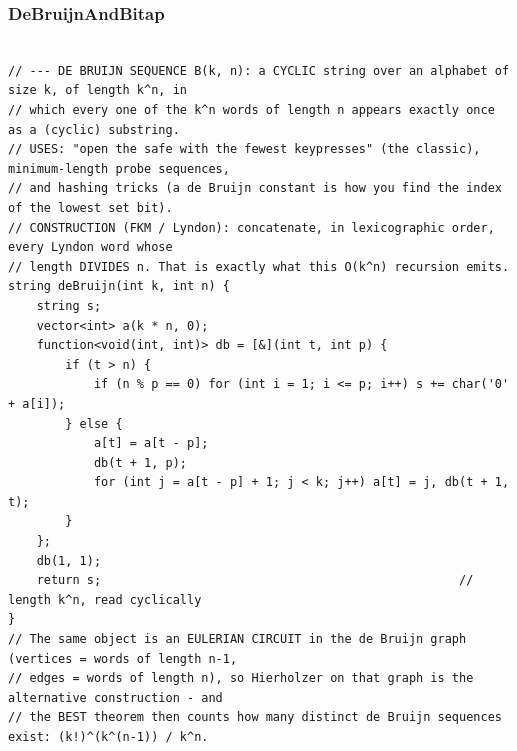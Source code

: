 \documentclass[9pt,a4paper,twocolumn]{extarticle}
\begin{document}
\subsubsection{DeBruijnAndBitap}
\nopagebreak
\begin{lstlisting}

// --- DE BRUIJN SEQUENCE B(k, n): a CYCLIC string over an alphabet of size k, of length k^n, in
// which every one of the k^n words of length n appears exactly once as a (cyclic) substring.
// USES: "open the safe with the fewest keypresses" (the classic), minimum-length probe sequences,
// and hashing tricks (a de Bruijn constant is how you find the index of the lowest set bit).
// CONSTRUCTION (FKM / Lyndon): concatenate, in lexicographic order, every Lyndon word whose
// length DIVIDES n. That is exactly what this O(k^n) recursion emits.
string deBruijn(int k, int n) {
    string s;
    vector<int> a(k * n, 0);
    function<void(int, int)> db = [&](int t, int p) {
        if (t > n) {
            if (n % p == 0) for (int i = 1; i <= p; i++) s += char('0' + a[i]);
        } else {
            a[t] = a[t - p];
            db(t + 1, p);
            for (int j = a[t - p] + 1; j < k; j++) a[t] = j, db(t + 1, t);
        }
    };
    db(1, 1);
    return s;                                                  // length k^n, read cyclically
}
// The same object is an EULERIAN CIRCUIT in the de Bruijn graph (vertices = words of length n-1,
// edges = words of length n), so Hierholzer on that graph is the alternative construction - and
// the BEST theorem then counts how many distinct de Bruijn sequences exist: (k!)^(k^(n-1)) / k^n.


\end{lstlisting}
\end{document}
